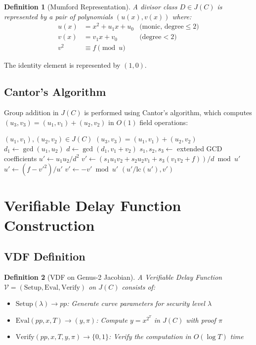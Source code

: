 \documentclass[11pt,a4paper]{article}
\newtheorem{definition}{Definition}
\begin{document}
\begin{definition}[Mumford Representation]
A divisor class $D \in J(C)$ is represented by a pair of polynomials $(u(x), v(x))$ where:
\begin{align}
u(x) &= x^2 + u_1x + u_0 & \text{(monic, degree} \leq 2\text{)} \\
v(x) &= v_1x + v_0 & \text{(degree} < 2\text{)} \\
v^2 &\equiv f \pmod{u} &
\end{align}
\end{definition}

The identity element is represented by $(1, 0)$.

\subsection{Cantor's Algorithm}

Group addition in $J(C)$ is performed using Cantor's algorithm, which computes $(u_3, v_3) = (u_1, v_1) + (u_2, v_2)$ in $O(1)$ field operations:

\begin{algorithm}
\caption{Cantor's Algorithm for Jacobian Addition}
\begin{algorithmic}[1]
\Require $(u_1, v_1), (u_2, v_2) \in J(C)$
\Ensure $(u_3, v_3) = (u_1, v_1) + (u_2, v_2)$
\State $d_1 \gets \gcd(u_1, u_2)$
\State $d \gets \gcd(d_1, v_1 + v_2)$
\State $s_1, s_2, s_3 \gets$ extended GCD coefficients
\State $u' \gets u_1 u_2 / d^2$
\State $v' \gets (s_1 u_1 v_2 + s_2 u_2 v_1 + s_3(v_1 v_2 + f)) / d \bmod u'$
    \State $u' \gets (f - v'^2) / u'$
    \State $v' \gets -v' \bmod u'$
\EndWhile
\State \Return $(u' / \text{lc}(u'), v')$
\end{algorithmic}
\end{algorithm}

\section{Verifiable Delay Function Construction}

\subsection{VDF Definition}

\begin{definition}[VDF on Genus-2 Jacobian]
A Verifiable Delay Function $\mathcal{V} = (\text{Setup}, \text{Eval}, \text{Verify})$ on $J(C)$ consists of:
\begin{itemize}
    \item $\text{Setup}(\lambda) \to pp$: Generate curve parameters for security level $\lambda$
    \item $\text{Eval}(pp, x, T) \to (y, \pi)$: Compute $y = x^{2^T}$ in $J(C)$ with proof $\pi$
    \item $\text{Verify}(pp, x, T, y, \pi) \to \{0, 1\}$: Verify the computation in $O(\log T)$ time
\end{itemize}
\end{definition}
\end{document}
